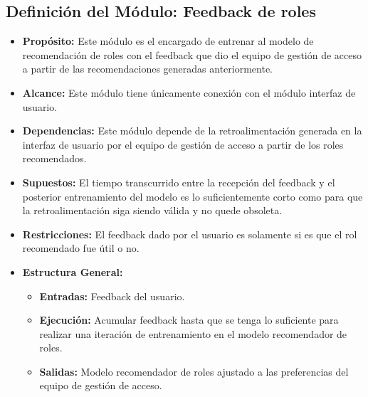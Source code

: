 \documentclass[11pt,letterpaper]{article}
\begin{document}
\subsection{Definición del Módulo: Feedback de roles}

\begin{itemize}

\item \textbf{Propósito:} Este módulo es el encargado de entrenar al modelo de recomendación de roles con el feedback que dio el equipo de gestión de acceso a partir de las recomendaciones generadas anteriormente.

\item \textbf{Alcance:} Este módulo tiene únicamente conexión con el módulo interfaz de usuario.

\item \textbf{Dependencias:}
Este módulo depende de la retroalimentación generada en la interfaz de usuario por el equipo de gestión de acceso a partir de los roles recomendados. 

\item \textbf{Supuestos:} El tiempo transcurrido entre la recepción del feedback y el posterior entrenamiento del modelo es lo suficientemente corto como para que la retroalimentación siga siendo válida y no quede obsoleta.
    


\item \textbf{Restricciones:} El feedback dado por el usuario es solamente si es que el rol recomendado fue útil o no.
    

\item \textbf{Estructura General:}
\begin{itemize}
    \item \textbf{Entradas:} Feedback del usuario.
    \item \textbf{Ejecución:} Acumular feedback hasta que se tenga lo suficiente para realizar una iteración de entrenamiento en el modelo recomendador de roles.
        
    \item \textbf{Salidas: } Modelo recomendador de roles ajustado a las preferencias del equipo de gestión de acceso.
\end{itemize}
\end{itemize}
\end{document}

